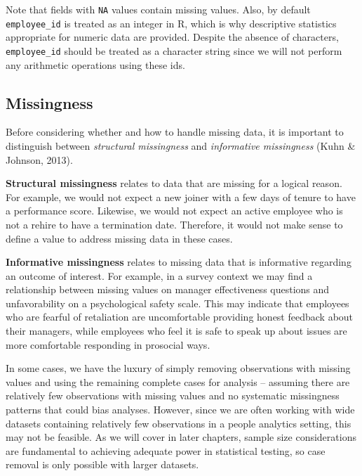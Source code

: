 \documentclass[
]{book}
\begin{document}
Note that fields with \texttt{NA} values contain missing values. Also, by default \texttt{employee\_id} is treated as an integer in R, which is why descriptive statistics appropriate for numeric data are provided. Despite the absence of characters, \texttt{employee\_id} should be treated as a character string since we will not perform any arithmetic operations using these ids.

\hypertarget{missingness}{%
\subsection{Missingness}\label{missingness}}

Before considering whether and how to handle missing data, it is important to distinguish between \emph{structural missingness} and \emph{informative missingness} (Kuhn \& Johnson, 2013).

\textbf{Structural missingness} relates to data that are missing for a logical reason. For example, we would not expect a new joiner with a few days of tenure to have a performance score. Likewise, we would not expect an active employee who is not a rehire to have a termination date. Therefore, it would not make sense to define a value to address missing data in these cases.

\textbf{Informative missingness} relates to missing data that is informative regarding an outcome of interest. For example, in a survey context we may find a relationship between missing values on manager effectiveness questions and unfavorability on a psychological safety scale. This may indicate that employees who are fearful of retaliation are uncomfortable providing honest feedback about their managers, while employees who feel it is safe to speak up about issues are more comfortable responding in prosocial ways.

In some cases, we have the luxury of simply removing observations with missing values and using the remaining complete cases for analysis -- assuming there are relatively few observations with missing values and no systematic missingness patterns that could bias analyses. However, since we are often working with wide datasets containing relatively few observations in a people analytics setting, this may not be feasible. As we will cover in later chapters, sample size considerations are fundamental to achieving adequate power in statistical testing, so case removal is only possible with larger datasets.
\end{document}
